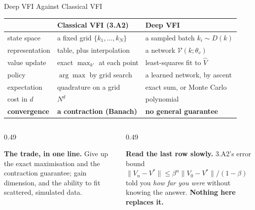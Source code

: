 \begin{frame}{Deep VFI Against Classical VFI}
\vspace{-1mm}
\begin{center}\footnotesize
\begin{tabularx}{\linewidth}{@{}>{\raggedright\arraybackslash}p{2.6cm} >{\raggedright\arraybackslash}X >{\raggedright\arraybackslash}X@{}}
\toprule
& \textbf{Classical VFI (3.A2)} & \textbf{Deep VFI} \\
\midrule
state space & a fixed grid $\{k_1,\dots,k_N\}$ & a sampled batch $k_i\sim D(k)$ \\
representation & table, plus interpolation & a network $\mathcal{V}(k;\theta_v)$ \\
value update & exact $\max_{k'}$ at each point & least-squares fit to $\hat V$ \\
policy & $\arg\max$ by grid search & a learned network, by ascent \\
expectation & quadrature on a grid & exact sum, or Monte Carlo \\
cost in $d$ & $N^{d}$ & polynomial \\
\textbf{convergence} & \textbf{a contraction (Banach)} & \textbf{no general guarantee} \\
\bottomrule
\end{tabularx}
\end{center}
\medskip
\begin{columns}[T]
\begin{column}{0.49\textwidth}
\begin{takeawaybox}\footnotesize
\textbf{The trade, in one line.} Give up the exact maximisation and the contraction guarantee; gain dimension, and the ability to fit scattered, simulated data.
\end{takeawaybox}
\end{column}
\begin{column}{0.49\textwidth}
\begin{cautionbox}\footnotesize
\textbf{Read the last row slowly.} 3.A2's error bound $\lVert V_n-V^{*}\rVert\le\beta^{n}\lVert V_0-V^{*}\rVert/(1-\beta)$ told you \emph{how far you were} without knowing the answer. \textbf{Nothing here replaces it.}
\end{cautionbox}
\end{column}
\end{columns}
\vspace{1mm}
\end{frame}

